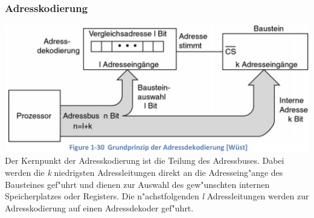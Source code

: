 \subsubsection{Adresskodierung}
\includegraphics[width=14cm]{images/Adressverwaltung}\\
Der Kernpunkt der Adresskodierung ist die Teilung des Adressbuses. Dabei werden die \textit{k} niedrigsten Adressleitungen direkt an die Adresseing"ange des Bausteines gef"uhrt und dienen zur Auswahl des gew"unschten internen Speicherplatzes oder Registers. Die n"achstfolgenden \textit{l} Adressleitungen werden zur Adresskodierung auf einen Adressdekoder gef"uhrt.
\clearpage






















